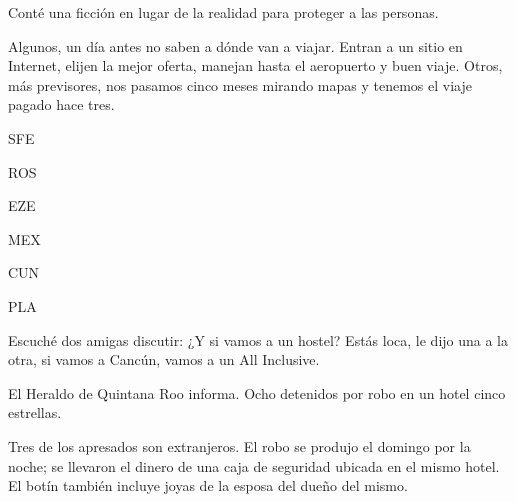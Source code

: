\documentclass[12pt,twoside,openright,a5paper]{book}
\begin{document}
Conté una ficción en lugar de la realidad para proteger a las personas.

\vspace{0.5cm}

\hrulefill\hspace{0.2cm} \decofourleft\decofourright \hspace{0.2cm} \hrulefill
\vspace{0.5cm}

Algunos, un día antes no saben a dónde van a viajar. Entran a un sitio
en Internet, elijen la mejor oferta, manejan hasta el aeropuerto y buen
viaje. Otros, más previsores, nos pasamos cinco meses mirando mapas y
tenemos el viaje pagado hace tres.

\vspace{0.5cm}

\hrulefill\hspace{0.2cm} \decofourleft\decofourright \hspace{0.2cm} \hrulefill
\vspace{0.5cm}

SFE

ROS

EZE

MEX

CUN

PLA

\vspace{0.5cm}

\hrulefill\hspace{0.2cm} \decofourleft\decofourright \hspace{0.2cm} \hrulefill
\vspace{0.5cm}

Escuché dos amigas discutir: ¿Y si vamos a un hostel? Estás loca, le
dijo una a la otra, si vamos a Cancún, vamos a un All Inclusive.


\vspace{0.5cm}

\hrulefill\hspace{0.2cm} \decofourleft\decofourright \hspace{0.2cm} \hrulefill
\vspace{0.5cm}

El Heraldo de Quintana Roo informa. Ocho detenidos por robo en un hotel
cinco estrellas.

Tres de los apresados son extranjeros. El robo se produjo el domingo por la
noche; se llevaron el dinero de una caja de seguridad ubicada en el mismo
hotel. El botín también incluye joyas de la esposa del dueño del mismo.
\end{document}
